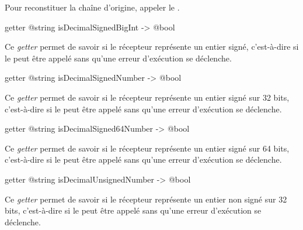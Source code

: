 Pour reconstituer la chaîne d'origine, appeler le .







\begin{galgas3box}
getter @string isDecimalSignedBigInt -> @bool
\end{galgas3box}

Ce \emph{getter} permet de savoir si le récepteur représente un entier signé, c'est-à-dire si le  peut être appelé sans qu'une erreur d'exécution se déclenche.







\begin{galgas3box}
getter @string isDecimalSignedNumber -> @bool
\end{galgas3box}

Ce \emph{getter} permet de savoir si le récepteur représente un entier signé sur 32 bits, c'est-à-dire si le  peut être appelé sans qu'une erreur d'exécution se déclenche.







\begin{galgas3box}
getter @string isDecimalSigned64Number -> @bool
\end{galgas3box}

Ce \emph{getter} permet de savoir si le récepteur représente un entier signé sur 64 bits, c'est-à-dire si le  peut être appelé sans qu'une erreur d'exécution se déclenche.







\begin{galgas3box}
getter @string isDecimalUnsignedNumber -> @bool
\end{galgas3box}

Ce \emph{getter} permet de savoir si le récepteur représente un entier non signé sur 32 bits, c'est-à-dire si le  peut être appelé sans qu'une erreur d'exécution se déclenche.






